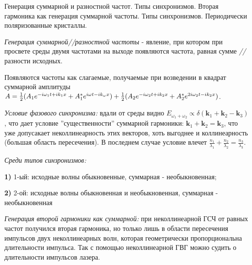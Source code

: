 
\begin{leftrules}
Генерация суммарной и разностной частот. Типы синхронизмов. Вторая гармоника как генерация суммарной частоты. Типы синхронизмов. Периодически поляризованные кристаллы.
\end{leftrules}





\begin{to_def}
    \textit{Генерация суммарной//разностной частоты} - явление, при котором при просвете среды двумя частотами на выходе появляются частота, равная сумме \textit{//} разности исходных.
\end{to_def}

Появляются частоты как слагаемые, получаемые при возведении в квадрат суммарной амплитуды $A = \frac{1}{2} (A_{1}e^{-i\omega_{1} t +i k_{1}x} + A^*_{1}e^{i\omega t -i k_{\omega}x}) + \\ \frac{1}{2} (A_{2}e^{-i\omega_{2} t +i k_{2}x} + A^*_{2}e^{2i\omega_{2} t -i k_{2}x})$.


\textit{Условие фазового синхронизма:} вдали от среды видно $E_{\omega_{1}+\omega_{2}} \propto \delta(\mathbf{k}_{1}+\mathbf{k}_{2}-\mathbf{k}_{3})$, что дает условие ''существенности'' суммарной гармоники: $\mathbf{k}_{1}+\mathbf{k}_{2}=\mathbf{k}_{3}$, что уже допусакает неколлинеарность этих векторов, хоть выгоднее и коллинеарность (большая область пересечения). В последнем случае условие влечет $\frac{n_{1}}{\lambda_{1}}+\frac{n_{2}}{\lambda_{2}}=\frac{n_{3}}{\lambda_{3}}$.


\textit{Среди типов синзронизмов:} \\
    \par \textbf{1)} 1-ый: исходные волны обыкновенные, суммарная - необыкновенная;\\
    \par \textbf{2)} 2-ой: исходные волны обыкновенная и необыкновенная, суммарная - необыкновенная


\textit{Генерация второй гармоники как суммарной:} при неколлинеарной ГСЧ от равных частот получился вторая гармоника, но только лишь в области пересечения импульсов двух неколлинеарных волн, которая геометрически пропорциональна длительности импульса. Так с помощью неколлинеарной ГВГ можно судить о длительности импульсов лазера.